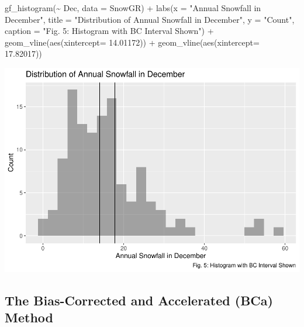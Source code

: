 \documentclass[12pt]{article}
\newenvironment{Shaded}{\begin{snugshade}}{\end{snugshade}}
\newcommand{\AttributeTok}[1]{\textcolor[rgb]{0.77,0.63,0.00}{#1}}
\newcommand{\FloatTok}[1]{\textcolor[rgb]{0.00,0.00,0.81}{#1}}
\newcommand{\FunctionTok}[1]{\textcolor[rgb]{0.00,0.00,0.00}{#1}}
\newcommand{\NormalTok}[1]{#1}
\newcommand{\SpecialCharTok}[1]{\textcolor[rgb]{0.00,0.00,0.00}{#1}}
\newcommand{\StringTok}[1]{\textcolor[rgb]{0.31,0.60,0.02}{#1}}
\begin{document}
\begin{Shaded}
\begin{Highlighting}[]
\FunctionTok{gf\_histogram}\NormalTok{(}\SpecialCharTok{\textasciitilde{}}\NormalTok{ Dec, }\AttributeTok{data =}\NormalTok{ SnowGR) }\SpecialCharTok{+}
  \FunctionTok{labs}\NormalTok{(}\AttributeTok{x =} \StringTok{"Annual Snowfall in December"}\NormalTok{, }
       \AttributeTok{title =} \StringTok{"Distribution of Annual Snowfall in December"}\NormalTok{, }\AttributeTok{y =} \StringTok{"Count"}\NormalTok{,}
       \AttributeTok{caption =} \StringTok{"Fig. 5: Histogram with BC Interval Shown"}\NormalTok{) }\SpecialCharTok{+}
  \FunctionTok{geom\_vline}\NormalTok{(}\FunctionTok{aes}\NormalTok{(}\AttributeTok{xintercept=} \FloatTok{14.01172}\NormalTok{)) }\SpecialCharTok{+}
  \FunctionTok{geom\_vline}\NormalTok{(}\FunctionTok{aes}\NormalTok{(}\AttributeTok{xintercept=} \FloatTok{17.82017}\NormalTok{))}
\end{Highlighting}
\end{Shaded}

\includegraphics{paper_files/figure-latex/unnamed-chunk-12-1.pdf}

\hypertarget{the-bias-corrected-and-accelerated-bca-method}{%
\subsection{The Bias-Corrected and Accelerated (BCa)
Method}\label{the-bias-corrected-and-accelerated-bca-method}}
\end{document}
